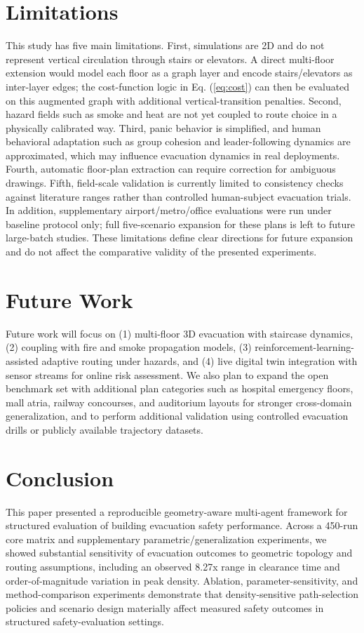 \documentclass[journal]{IEEEtran}
\begin{document}
\section{Limitations}
This study has five main limitations. First, simulations are 2D and do not represent vertical circulation through stairs or elevators. A direct multi-floor extension would model each floor as a graph layer and encode stairs/elevators as inter-layer edges; the cost-function logic in Eq. (\ref{eq:cost}) can then be evaluated on this augmented graph with additional vertical-transition penalties. Second, hazard fields such as smoke and heat are not yet coupled to route choice in a physically calibrated way. Third, panic behavior is simplified, and human behavioral adaptation such as group cohesion and leader-following dynamics are approximated, which may influence evacuation dynamics in real deployments. Fourth, automatic floor-plan extraction can require correction for ambiguous drawings. Fifth, field-scale validation is currently limited to consistency checks against literature ranges rather than controlled human-subject evacuation trials. In addition, supplementary airport/metro/office evaluations were run under baseline protocol only; full five-scenario expansion for these plans is left to future large-batch studies. These limitations define clear directions for future expansion and do not affect the comparative validity of the presented experiments.

\section{Future Work}
Future work will focus on (1) multi-floor 3D evacuation with staircase dynamics, (2) coupling with fire and smoke propagation models, (3) reinforcement-learning-assisted adaptive routing under hazards, and (4) live digital twin integration with sensor streams for online risk assessment. We also plan to expand the open benchmark set with additional plan categories such as hospital emergency floors, mall atria, railway concourses, and auditorium layouts for stronger cross-domain generalization, and to perform additional validation using controlled evacuation drills or publicly available trajectory datasets.

\section{Conclusion}
This paper presented a reproducible geometry-aware multi-agent framework for structured evaluation of building evacuation safety performance. Across a 450-run core matrix and supplementary parametric/generalization experiments, we showed substantial sensitivity of evacuation outcomes to geometric topology and routing assumptions, including an observed 8.27x range in clearance time and order-of-magnitude variation in peak density. Ablation, parameter-sensitivity, and method-comparison experiments demonstrate that density-sensitive path-selection policies and scenario design materially affect measured safety outcomes in structured safety-evaluation settings.
\end{document}
